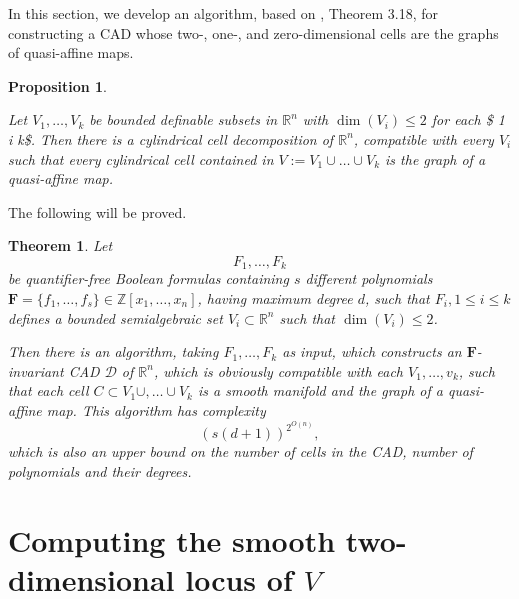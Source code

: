 \documentclass[
]{book}
\newtheorem{theorem}{Theorem}[chapter]
\newtheorem{proposition}{Proposition}[chapter]
\theoremstyle{definition}
\theoremstyle{definition}
\theoremstyle{definition}
\theoremstyle{definition}
\theoremstyle{remark}
\begin{document}
In this section, we develop an algorithm, based on \citet{bgv15}, Theorem 3.18, for constructing a CAD whose two-, one-, and zero-dimensional cells are the graphs of quasi-affine maps.

\begin{proposition}
\protect\hypertarget{prp:bgv-quase}{}\label{prp:bgv-quase}\citep[Theorem 3.19]{bgv15}

Let \(V_1,\ldots,V_k\) be bounded deﬁnable subsets in \(\mathbb{R}^n\) with \(\dim (V_i) \le 2\) for each
\$ 1 \le i \le k\$.
Then there is a cylindrical cell decomposition of \(\mathbb{R}^n\), compatible with every \(V_i\) such that every cylindrical cell contained in \(V := V_1\cup\ldots\cup V_k\) is the graph of a quasi-affine map.
\end{proposition}

The following will be proved.

\begin{theorem}
\protect\hypertarget{thm:bgv-quasi-algorithm}{}\label{thm:bgv-quasi-algorithm}Let
\[
F_1,\ldots,F_k
\]
be quantifier-free Boolean formulas containing \(s\) different polynomials \(\mathbf{F} = \{ f_1,\ldots, f_s \} \in \mathbb{Z}[x_1,\ldots,x_n]\), having maximum degree \(d\), such that \(F_i, 1\le i \le k\) defines a bounded semialgebraic set \(V_i \subset \mathbb{R}^n\) such that \(\dim(V_i) \le 2\).

Then there is an algorithm, taking \(F_1,\ldots,F_k\) as input, which constructs an \(\mathbf{F}\)-invariant CAD \(\mathcal{D}\) of \(\mathbb{R}^n\), which is obviously compatible with each \(V_1,\ldots,v_k\), such that each cell \(C \subset V_1\cup,\ldots\cup V_k\) is a smooth manifold and the graph of a quasi-affine map.
This algorithm has complexity
\[
\left(s\left(d+1\right)\right)^{2^{O(n)}},
\]
which is also an upper bound on the number of cells in the CAD, number of polynomials and their degrees.
\end{theorem}

\hypertarget{computing-the-smooth-two-dimensional-locus-of-v}{%
\section{\texorpdfstring{Computing the smooth two-dimensional locus of \(V\)}{Computing the smooth two-dimensional locus of V}}\label{computing-the-smooth-two-dimensional-locus-of-v}}
\end{document}
